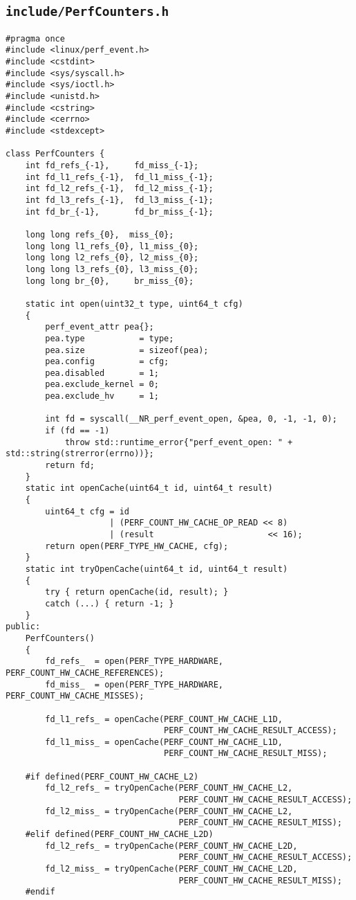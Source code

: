 \subsection{\texttt{include/PerfCounters.h}}
\label{secsec:perfcounters-h}
\begin{lstlisting}
#pragma once
#include <linux/perf_event.h>
#include <cstdint>
#include <sys/syscall.h>
#include <sys/ioctl.h>
#include <unistd.h>
#include <cstring>
#include <cerrno>
#include <stdexcept>

class PerfCounters {
    int fd_refs_{-1},     fd_miss_{-1}; 
    int fd_l1_refs_{-1},  fd_l1_miss_{-1};
    int fd_l2_refs_{-1},  fd_l2_miss_{-1};
    int fd_l3_refs_{-1},  fd_l3_miss_{-1};
    int fd_br_{-1},       fd_br_miss_{-1};  

    long long refs_{0},  miss_{0};
    long long l1_refs_{0}, l1_miss_{0};
    long long l2_refs_{0}, l2_miss_{0};
    long long l3_refs_{0}, l3_miss_{0};
    long long br_{0},     br_miss_{0};

    static int open(uint32_t type, uint64_t cfg)
    {
        perf_event_attr pea{};
        pea.type           = type;
        pea.size           = sizeof(pea);
        pea.config         = cfg;
        pea.disabled       = 1;
        pea.exclude_kernel = 0;
        pea.exclude_hv     = 1;

        int fd = syscall(__NR_perf_event_open, &pea, 0, -1, -1, 0);
        if (fd == -1)
            throw std::runtime_error{"perf_event_open: " + std::string(strerror(errno))};
        return fd;
    }
    static int openCache(uint64_t id, uint64_t result)
    {
        uint64_t cfg = id
                     | (PERF_COUNT_HW_CACHE_OP_READ << 8)
                     | (result                       << 16);
        return open(PERF_TYPE_HW_CACHE, cfg);
    }
    static int tryOpenCache(uint64_t id, uint64_t result)
    {
        try { return openCache(id, result); }
        catch (...) { return -1; }
    }
public:
    PerfCounters()
    {
        fd_refs_  = open(PERF_TYPE_HARDWARE, PERF_COUNT_HW_CACHE_REFERENCES);
        fd_miss_  = open(PERF_TYPE_HARDWARE, PERF_COUNT_HW_CACHE_MISSES);

        fd_l1_refs_ = openCache(PERF_COUNT_HW_CACHE_L1D,
                                PERF_COUNT_HW_CACHE_RESULT_ACCESS);
        fd_l1_miss_ = openCache(PERF_COUNT_HW_CACHE_L1D,
                                PERF_COUNT_HW_CACHE_RESULT_MISS);

    #if defined(PERF_COUNT_HW_CACHE_L2)
        fd_l2_refs_ = tryOpenCache(PERF_COUNT_HW_CACHE_L2,
                                   PERF_COUNT_HW_CACHE_RESULT_ACCESS);
        fd_l2_miss_ = tryOpenCache(PERF_COUNT_HW_CACHE_L2,
                                   PERF_COUNT_HW_CACHE_RESULT_MISS);
    #elif defined(PERF_COUNT_HW_CACHE_L2D)
        fd_l2_refs_ = tryOpenCache(PERF_COUNT_HW_CACHE_L2D,
                                   PERF_COUNT_HW_CACHE_RESULT_ACCESS);
        fd_l2_miss_ = tryOpenCache(PERF_COUNT_HW_CACHE_L2D,
                                   PERF_COUNT_HW_CACHE_RESULT_MISS);
    #endif


\end{lstlisting}
